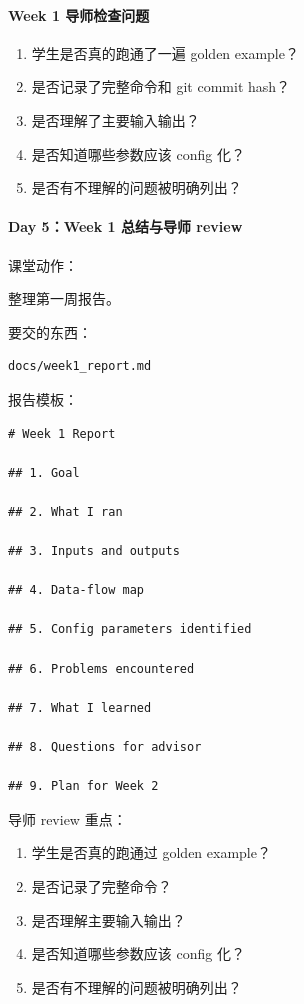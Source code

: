 \documentclass[11pt,a4paper,fontset=fandol]{ctexart}
\begin{document}
\paragraph{Week 1 导师检查问题}
\begin{enumerate}[leftmargin=2em]
  \item 学生是否真的跑通了一遍 golden example？
  \item 是否记录了完整命令和 git commit hash？
  \item 是否理解了主要输入输出？
  \item 是否知道哪些参数应该 config 化？
  \item 是否有不理解的问题被明确列出？
\end{enumerate}

\paragraph{Day 5：Week 1 总结与导师 review}

课堂动作：

整理第一周报告。

要交的东西：

\begin{lstlisting}
docs/week1_report.md
\end{lstlisting}

报告模板：

\begin{lstlisting}
# Week 1 Report

## 1. Goal

## 2. What I ran

## 3. Inputs and outputs

## 4. Data-flow map

## 5. Config parameters identified

## 6. Problems encountered

## 7. What I learned

## 8. Questions for advisor

## 9. Plan for Week 2
\end{lstlisting}

导师 review 重点：

\begin{enumerate}[leftmargin=2em]
  \item 学生是否真的跑通过 golden example？
  \item 是否记录了完整命令？
  \item 是否理解主要输入输出？
  \item 是否知道哪些参数应该 config 化？
  \item 是否有不理解的问题被明确列出？
\end{enumerate}
\end{document}
